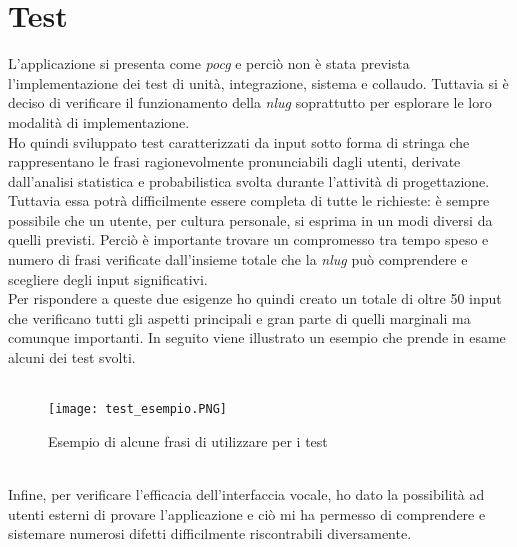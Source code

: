 \section{Test}
L'applicazione si presenta come \emph{\gls{pocg}} e perciò non è stata prevista l'implementazione dei test di unità, integrazione, sistema e collaudo. Tuttavia si è deciso di verificare il funzionamento della \emph{\gls{nlug}} soprattutto per esplorare le loro modalità di implementazione. \\
Ho quindi sviluppato test caratterizzati da input sotto forma di stringa che rappresentano le frasi ragionevolmente pronunciabili dagli utenti, derivate dall'analisi statistica e probabilistica svolta durante l'attività di progettazione. Tuttavia essa potrà difficilmente essere completa di tutte le richieste: è sempre possibile che un utente, per cultura personale, si esprima in un modi diversi da quelli previsti. Perciò è importante trovare un compromesso tra tempo speso e numero di frasi verificate dall'insieme totale che la \emph{\gls{nlug}} può comprendere e scegliere degli input significativi. \\
Per rispondere a queste due esigenze ho quindi creato un totale di oltre 50 input che verificano tutti gli aspetti principali e gran parte di quelli marginali ma comunque importanti. In seguito viene illustrato un esempio che prende in esame alcuni dei test svolti. \\
\pagebreak
\\
\begin{figure}[htbp]
	\begin{center}
		\texttt{[image: test\_esempio.PNG]}
		\caption{Esempio di alcune frasi di utilizzare per i test}
	\end{center}
\end{figure}
\\
Infine, per verificare l'efficacia dell'interfaccia vocale, ho dato la possibilità ad utenti esterni di provare l'applicazione e ciò mi ha permesso di comprendere e sistemare numerosi difetti difficilmente riscontrabili diversamente.
